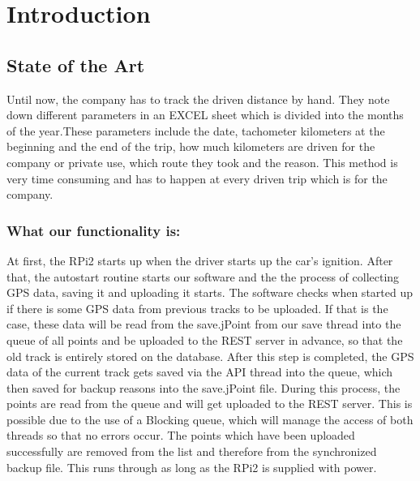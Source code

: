 \newpage
\chapter*{Introduction}
\section*{State of the Art}
Until now, the company has to track the driven distance by hand. They note down different parameters in an EXCEL sheet which is divided into the months of the year.These parameters include the date, tachometer kilometers at the beginning and the end of the trip, how much kilometers are driven for the company or private use, which route they took and the reason.\newline
This method is very time consuming and has to happen at every driven trip which is for the company. 
\subsection*{What our functionality is:}
At first, the RPi2 starts up when the driver starts up the car's ignition. After that, the autostart routine starts our software and the the process of collecting GPS data, saving it and uploading it starts.\newline
The software checks when started up if there is some GPS data from previous tracks to be uploaded. If that is the case, these data will be read from the save.jPoint from our save thread into the queue of all points and be uploaded to the REST server in advance, so that the old track is entirely stored on the database. \newline
After this step is completed, the GPS data of the current track gets saved via the API thread into the queue, which then saved for backup reasons into the save.jPoint file.\newline
During this process, the points are read from the queue and will get uploaded to the REST server. This is possible due to the use of a Blocking queue, which will manage the access of both threads so that no errors occur.\newline
The points which have been uploaded successfully are removed from the list and therefore from the synchronized backup file.\newline
This runs through as long as the RPi2 is supplied with power.


\newpage
